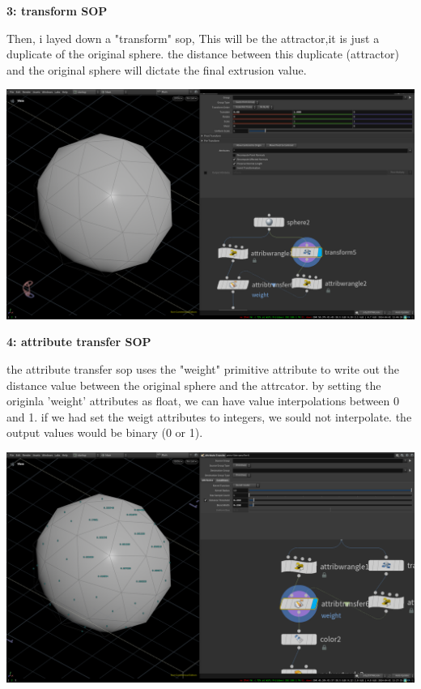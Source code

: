 \documentclass[11pt, a4paper, twoside]{article}
\begin{document}
	\vspace{10pt}

	\begin{minipage}[H]{0.4\textwidth}
		\textbf{3: transform SOP}\newline 

Then, i layed down a "transform" sop, This will be the attractor,it is just a
duplicate of the original sphere. the distance between this duplicate
(attractor) and the original sphere will dictate the final extrusion value. 
	
	\end{minipage}
	\vspace{1pt}
	\begin{minipage}[H]{0.6\textwidth}
		\includegraphics[width=1\textwidth]{media/houdini_fundamentals_3.png}
	\end{minipage}


	\begin{minipage}[H]{0.4\textwidth}
		\textbf{4: attribute transfer SOP}\newline 

the attribute transfer sop uses the "weight" primitive attribute to write out
the distance value between the original sphere and the attrcator. by setting the
originla 'weight' attributes as float, we can have value interpolations between
0 and 1. if we had set the weigt attributes to integers, we sould not
interpolate. the output values  would be binary (0 or 1). 
 
	\end{minipage}
	\vspace{1pt}
	\begin{minipage}[H]{0.6\textwidth}
		\includegraphics[width=1\textwidth]{media/houdini_fundamentals_4.png}
	\end{minipage}
\end{document}
